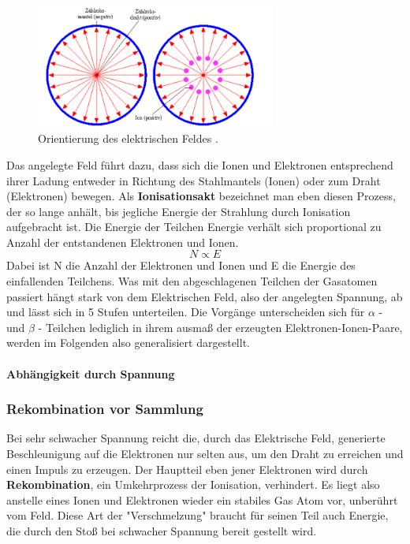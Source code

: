 \begin{figure} %
  \centering
  \includegraphics[width=0.7\textwidth]{bilder/Abbildung3.png}
  \caption{Orientierung des elektrischen Feldes \cite{leifi}.} 
  \label{fig:efeld}
\end{figure}

Das angelegte Feld führt dazu, dass sich die Ionen und Elektronen entsprechend ihrer Ladung entweder in Richtung des Stahlmantels (Ionen) oder zum Draht (Elektronen) bewegen.
Als \textbf{Ionisationsakt} bezeichnet man eben diesen Prozess, der so lange anhält, bis jegliche Energie der Strahlung durch Ionisation aufgebracht ist.
Die Energie der Teilchen Energie verhält sich proportional zu Anzahl der entstandenen Elektronen und Ionen. 
\begin{equation}
\label{eqn:prop}
N \propto E
\end{equation}
Dabei ist N die Anzahl der Elektronen und Ionen und E die Energie des einfallenden Teilchens.
Was mit den abgeschlagenen Teilchen der Gasatomen passiert hängt stark von dem Elektrischen Feld, also der angelegten Spannung, ab und lässt sich in 5 Stufen unterteilen.
Die Vorgänge unterscheiden sich für $\alpha$ - und $\beta$ - Teilchen lediglich in ihrem ausmaß der erzeugten Elektronen-Ionen-Paare, werden im Folgenden also generalisiert dargestellt.
\paragraph{Abhängigkeit durch Spannung} \mbox{}

\subsubsection{Rekombination vor Sammlung}
\label{sub:Rekombination}
Bei sehr schwacher Spannung reicht die, durch das Elektrische Feld, generierte Beschleunigung auf die Elektronen nur selten aus, um den Draht zu erreichen und einen Impuls zu erzeugen.
Der Hauptteil eben jener Elektronen wird durch \textbf{Rekombination}, ein Umkehrprozess der Ionisation, verhindert. Es liegt also anstelle eines Ionen und Elektronen wieder ein stabiles Gas Atom vor, unberührt vom Feld.
Diese Art der "Verschmelzung" braucht für seinen Teil auch Energie, die durch den Stoß bei schwacher Spannung bereit gestellt wird.
